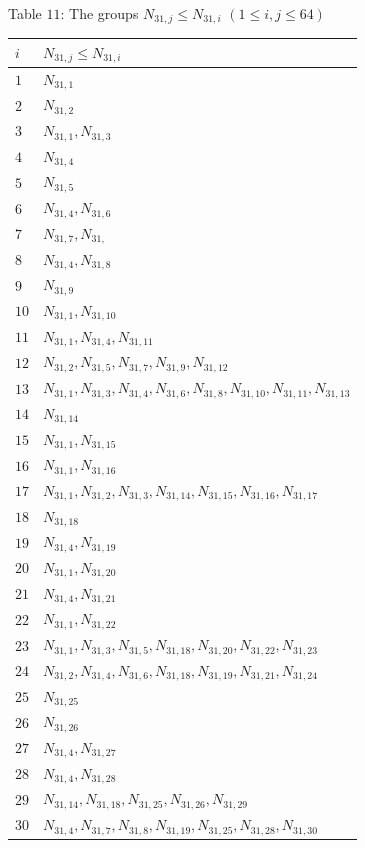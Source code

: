 \documentclass{amsart}
\theoremstyle{plain}
\theoremstyle{definition}
\theoremstyle{remark}
\begin{document}
Table $11$: The groups $N_{31,j}\leq N_{31,i}$ $(1\leq i,j\leq 64)$
{\small 
\begin{longtable}{ll}
$i$ & $N_{31,j}\leq N_{31,i}$\\\hline
\endfirsthead
$1$ & $N_{31,1}$\\
$2$ & $N_{31,2}$\\
$3$ & $N_{31,1}, N_{31,3}$\\
$4$ & $N_{31,4}$\\
$5$ & $N_{31,5}$\\
$6$ & $N_{31,4}, N_{31,6}$\\
$7$ & $N_{31,7}, N_{31,}$\\
$8$ & $N_{31,4}, N_{31,8}$\\
$9$ & $N_{31,9}$\\
$10$ & $N_{31,1}, N_{31,10}$\\
$11$ & $N_{31,1}, N_{31,4}, N_{31,11}$\\
$12$ & $N_{31,2}, N_{31,5}, N_{31,7}, N_{31,9}, N_{31,12}$\\
$13$ & $N_{31,1}, N_{31,3}, N_{31,4}, N_{31,6}, N_{31,8}, N_{31,10}, N_{31,11}, N_{31,13}$\\
$14$ & $N_{31,14}$\\
$15$ & $N_{31,1}, N_{31,15}$\\
$16$ & $N_{31,1}, N_{31,16}$\\
$17$ & $N_{31,1}, N_{31,2}, N_{31,3}, N_{31,14}, N_{31,15}, N_{31,16}, N_{31,17}$\\
$18$ & $N_{31,18}$\\
$19$ & $N_{31,4}, N_{31,19}$\\
$20$ & $N_{31,1}, N_{31,20}$\\
$21$ & $N_{31,4}, N_{31,21}$\\
$22$ & $N_{31,1}, N_{31,22}$\\
$23$ & $N_{31,1}, N_{31,3}, N_{31,5}, N_{31,18}, N_{31,20}, N_{31,22}, N_{31,23}$\\
$24$ & $N_{31,2}, N_{31,4}, N_{31,6}, N_{31,18}, N_{31,19}, N_{31,21}, N_{31,24}$\\
$25$ & $N_{31,25}$\\
$26$ & $N_{31,26}$\\
$27$ & $N_{31,4}, N_{31,27}$\\
$28$ & $N_{31,4}, N_{31,28}$\\
$29$ & $N_{31,14}, N_{31,18}, N_{31,25}, N_{31,26}, N_{31,29}$\\
$30$ & $N_{31,4}, N_{31,7}, N_{31,8}, N_{31,19}, N_{31,25}, N_{31,28}, N_{31,30}$\\

\end{longtable}}
\end{document}
